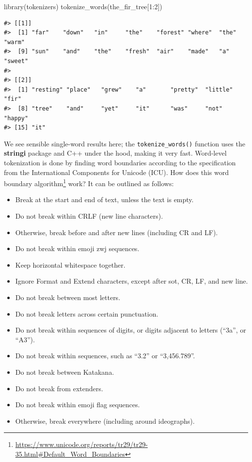 \documentclass[
]{krantz}
\makeatletter
\newenvironment{Shaded}{\begin{snugshade}}{\end{snugshade}}
\newcommand{\DecValTok}[1]{\textcolor[rgb]{0.00,0.00,0.81}{#1}}
\newcommand{\FunctionTok}[1]{\textcolor[rgb]{0.00,0.00,0.00}{#1}}
\newcommand{\NormalTok}[1]{#1}
\newcommand{\SpecialCharTok}[1]{\textcolor[rgb]{0.00,0.00,0.00}{#1}}
\DeclareRobustCommand{\href}[2]{#2\footnote{\url{#1}}}
\renewcommand{\href}[2]{#2\footnote{\url{#1}}}
\newenvironment{kframe}{%
\medskip{}
\setlength{\fboxsep}{.8em}
 \def\at@end@of@kframe{}%
 \ifinner\ifhmode%
  \def\at@end@of@kframe{\end{minipage}}%
  \begin{minipage}{\columnwidth}%
 \fi\fi%
 \def\FrameCommand##1{\hskip\@totalleftmargin \hskip-\fboxsep
 \colorbox{shadecolor}{##1}\hskip-\fboxsep
     \hskip-\linewidth \hskip-\@totalleftmargin \hskip\columnwidth}%
 \MakeFramed {\advance\hsize-\width
   \@totalleftmargin\z@ \linewidth\hsize
   \@setminipage}}%
 {\par\unskip\endMakeFramed%
 \at@end@of@kframe}
\renewenvironment{Shaded}{\begin{kframe}}{\end{kframe}}
\makeatother
\begin{document}
\begin{Shaded}
\begin{Highlighting}[]
\FunctionTok{library}\NormalTok{(tokenizers)}
\FunctionTok{tokenize\_words}\NormalTok{(the\_fir\_tree[}\DecValTok{1}\SpecialCharTok{:}\DecValTok{2}\NormalTok{])}
\end{Highlighting}
\end{Shaded}

\begin{verbatim}
#> [[1]]
#>  [1] "far"    "down"   "in"     "the"    "forest" "where"  "the"    "warm"  
#>  [9] "sun"    "and"    "the"    "fresh"  "air"    "made"   "a"      "sweet" 
#> 
#> [[2]]
#>  [1] "resting" "place"   "grew"    "a"       "pretty"  "little"  "fir"    
#>  [8] "tree"    "and"     "yet"     "it"      "was"     "not"     "happy"  
#> [15] "it"
\end{verbatim}

We see sensible single-word results here; the \texttt{tokenize\_words()} function uses the \textbf{stringi} package \citep{Gagolewski19} and C++ under the hood, making it very fast. Word-level tokenization is done by finding word boundaries according to the specification from the International Components for Unicode (ICU). How does this \href{https://www.unicode.org/reports/tr29/tr29-35.html\#Default_Word_Boundaries}{word boundary algorithm} work? It can be outlined as follows:

\begin{itemize}
\item
  Break at the start and end of text, unless the text is empty.
\item
  Do not break within CRLF (new line characters).
\item
  Otherwise, break before and after new lines (including CR and LF).
\item
  Do not break within emoji zwj sequences.
\item
  Keep horizontal whitespace together.
\item
  Ignore Format and Extend characters, except after sot, CR, LF, and new line.
\item
  Do not break between most letters.
\item
  Do not break letters across certain punctuation.
\item
  Do not break within sequences of digits, or digits adjacent to letters (``3a'', or ``A3'').
\item
  Do not break within sequences, such as ``3.2'' or ``3,456.789''.
\item
  Do not break between Katakana.
\item
  Do not break from extenders.
\item
  Do not break within emoji flag sequences.
\item
  Otherwise, break everywhere (including around ideographs).
\end{itemize}
\end{document}

